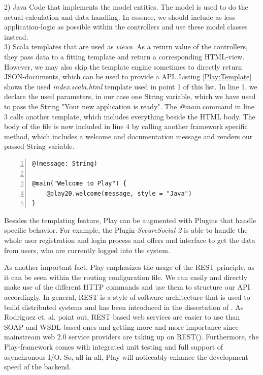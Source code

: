 2) Java Code that implements the model entities. The model is used to do the actual calculation and data handling. In essence, we should include as less application-logic as possible within the controllers and use these model classes instead. \\
3) Scala templates that are used as \textit{views}. As a return value of the controllers, they pass data to a fitting template and return a corresponding \ac{HTML}-view. However, we may also skip the template engine sometimes to directly return \ac{JSON}-documents, which can be used to provide a \ac{API}. Listing \ref{Play:Template} shows the used \textit{index.scala.html} template used in point 1 of this list. In line 1, we declare the used parameters, in our case one String variable, which we have used to pass the String "Your new application is ready". The \textit{@main} command in line 3 calls another template, which includes everything beside the \ac{HTML} body. The body of the file is now included in line 4 by calling another framework specific method, which includes a welcome and documentation message and renders our passed String variable.

\begin{lstlisting}[numbers=left,caption={Simple Scala template within the Play Framework},label=Play:Template,frame=tlbr,breaklines]
@(message: String)

@main("Welcome to Play") {
    @play20.welcome(message, style = "Java")
}
\end{lstlisting}

Besides the templating feature, Play can be augmented with Plugins that handle specific behavior. For example, the Plugin \emph{SecureSocial 2} is able to handle the whole user registration and login process and offers and interface to get the data from users, who are currently logged into the system.

As another important fact, Play emphasizes the usage of the \ac{REST} principle, as it can be seen within the routing configuration file. We can easily and directly make use of the different \ac{HTTP} commands and use them to structure our \ac{API} accordingly. In general, \acf{REST} is a style of software architecture that is used to build distributed systems and has been introduced in the dissertation of \cite{Fielding2000}. 
As Rodriguez et. al. point out, \ac{REST} based web services are easier to use than \acf{SOAP} and \acf{WSDL}-based ones and getting more and more importance since mainstream web 2.0 service providers are taking up on \ac{REST}(\cite{Rodriguez2008}). Furthermore, the Play-framework comes with integrated unit testing and full support of asynchronous I/O.  So, all in all, Play will noticeably enhance the development speed of the backend.

